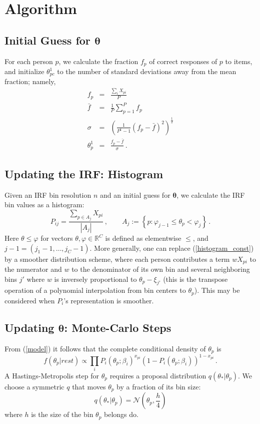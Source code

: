 \documentclass{article}
\newcommand{\bta}{\boldsymbol\ta}
\newcommand{\ta}{\theta}
\newcommand{\Normal}{\mathcal{N}}
\newcommand{\R}{\mathbb{R}}
\begin{document}
\section{Algorithm}
\subsection{Initial Guess for $\bta$}
\label{initial_guess}
For each person $p$, we calculate the fraction $f_{p}$ of correct responses of $p$ to items, and initialize $\ta^1_{pc}$ to the number of standard deviations away from the mean fraction; namely,
\begin{eqnarray}
	f_{p} &=& \frac{\sum_{i} X_{pi}}{P} \\
	\bar{f} &=& \frac{1}{P} \sum_{p=1}^{P} f_{p} \\
	\sigma &=& \left(\frac{1}{P^1-1} (f_{p} - \bar{f})^2 \right)^{\frac12} \\
	\ta^1_{p} &=& \frac{f_{p} - \bar{f}}{\sigma}\,.
	\label{coarsest_init}
\end{eqnarray}

\subsection{Updating the IRF: Histogram}
\label{histogram}
Given an IRF bin resolution $n$ and an initial guess for $\bta$, we calculate the IRF bin values as a histogram:
\begin{equation}
	\label{histogram_const}
	P_{ij} = \frac{\sum_{p \in A_j} X_{pi}}{|A_j|}\,,\qquad
	A_j := \left\{ p : \varphi_{j-1} \leq \ta_p < \varphi_j \right\}\,.
\end{equation}
Here $\ta \leq \varphi$ for vectors $\ta,\varphi \in \R^C$ is defined as elementwise $\leq$, and $j-1 = (j_1-1,\dots,j_C-1)$.
More generally, one can replace (\ref{histogram_const}) by a smoother distribution scheme, where each person contributes a term $w X_{pi}$ to the numerator and $w$ to the denominator of its own bin and several neighboring bins $j'$ where $w$ is inversely proportional to $\ta_p - \xi_{j'}$ (this is the transpose operation of a polynomial interpolation from bin centers to $\ta_p$). This may be considered when $P_i$'s representation is smoother.

\subsection{Updating $\bta$: Monte-Carlo Steps}
\label{metropolis}
From (\ref{model}) it follows that the complete conditional density of $\ta_p$ is
\begin{equation}
  f(\ta_p|rest) \propto \prod_i 
  P_i(\ta_p;\beta_i)^{x_{pi}}\left(1 - P_i(\ta_p;\beta_i)\right)^{1-x_{pi}}\,.
  \label{cond_ta}
\end{equation}
A Hastings-Metropolis step for $\ta_p$ requires a proposal distribution $q(\ta_*|\ta_p)$. We choose a symmetric $q$ that moves $\ta_p$ by a fraction of its bin size:
\begin{equation}
	q(\ta_*|\ta_p) = \Normal(\ta_p, \frac{h}{4})
	\label{proposal}
\end{equation}
where $h$ is the size of the bin $\ta_p$ belongs do.
\end{document}
